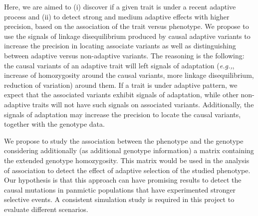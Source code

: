 \documentclass[a4paper,11pt]{article}
\begin{document}
Here, we are aimed to (i) discover if a given trait is under a recent adaptive process and (ii) to detect strong and medium adaptive effects with higher precision, based on the association of the trait versus phenotype. We propose to use the signals of linkage disequilibrium produced by causal adaptive variants to increase the precision in locating associate variants as well as distinguishing  between adaptive versus non-adaptive variants. The reasoning is the following: the causal variants of an adaptive trait will left signals of adaptation (\textit{e.g.,}, increase of homozygosity around the causal variants, more linkage disequilibrium, reduction of variation) around them. If a trait is under adaptive pattern, we expect that the associated variants exhibit signals of adaptation, while other non-adaptive traits will not have such signals on associated variants. Additionally, the signals of adaptation may increase the precision to locate the causal variants, together with the genotype data. 

We propose to study the association between the phenotype and the genotype considering  additionally (as additional genotype information)  a matrix containing the extended genotype homozygosity.  This matrix would be used in the analysis of association to detect the effect of adaptive selection of the studied phenotype. %
Our hypothesis is that this approach can have  promising results to detect the causal mutations in panmictic populations that have experimented stronger selective events. %
A consistent simulation study is required in this project to evaluate different scenarios.
\end{document}
